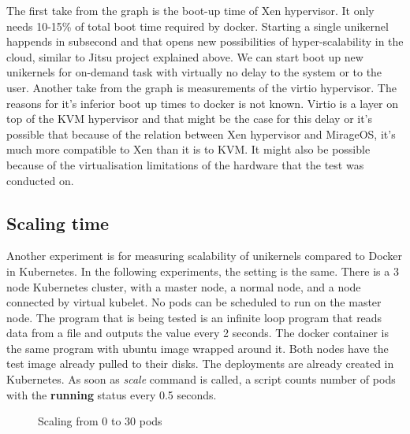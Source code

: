 The first take from the graph is the boot-up time of Xen hypervisor. It only needs 10-15\% of total boot time required by docker. Starting a single unikernel happends in subsecond and that opens new possibilities of hyper-scalability in the cloud, similar to Jitsu project explained above. We can start boot up new unikernels for on-demand task with virtually no delay to the system or to the user. Another take from the graph is measurements of the virtio\cite{virtio} hypervisor. The reasons for it's inferior boot up times to docker is not known. Virtio is a layer on top of the KVM hypervisor and that might be the case for this delay or it's possible that because of the relation between Xen hypervisor and MirageOS, it's much more compatible to Xen than it is to KVM. It might also be possible because of the virtualisation limitations of the hardware that the test was conducted on.

\subsection{Scaling time}
Another experiment is for measuring scalability of unikernels compared to Docker in Kubernetes. In the following experiments, the setting is the same. There is a 3 node Kubernetes cluster, with a master node, a normal node, and a node connected by virtual kubelet. No pods can be scheduled to run on the master node. The program that is being tested is an infinite loop program that reads data from a file and outputs the value every 2 seconds. The docker container is the same program with ubuntu image wrapped around it. Both nodes have the test image already pulled to their disks. The deployments are already created in Kubernetes. As soon as \textit{scale} command is called, a script counts number of pods with the \textbf{running} status every 0.5 seconds.

\begin{figure}[htpb]
  \centering
  \caption{Scaling from 0 to 30 pods}\label{fig:scale-up-30}
  \end{figure}

